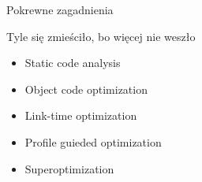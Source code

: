 \begin{frame}{Pokrewne zagadnienia}
	\begin{block}{Tyle się zmieściło, bo więcej nie weszło}
		\begin{itemize}
			\item Static code analysis
			\item Object code optimization
			\item Link-time optimization
			\item Profile guieded optimization
			\item Superoptimization
		\end{itemize}
	\end{block}
\end{frame}